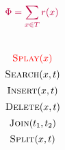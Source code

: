 \begin{frame}{}
  \begin{columns}
      \[
	\textcolor{purple}{\Phi = \sum_{x \in T} r(x)}
      \]

      \pause
  \end{columns}
\end{frame}

\begin{frame}{}
  \begin{columns}
      \begin{center}
	\[
	  \textcolor{red}{\textsc{Splay}(x)}
	\]
	\pause
	\[
	  \textsc{Search}(x, t)
	\]
	\[
	  \textsc{Insert}(x, t)
	\]
	\[
	  \textsc{Delete}(x, t)
	\]
	\[
	  \textsc{Join}(t_1, t_2)
	\]
	\[
	  \textsc{Split}(x, t)
	\]
      \end{center}
      \pause
  \end{columns}
\end{frame}
